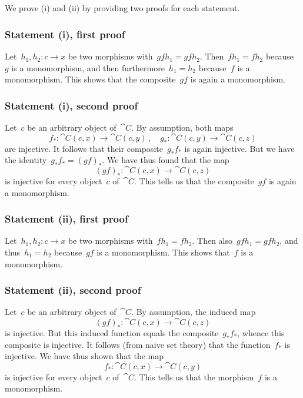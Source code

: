 \subsection{}

We prove (i) and (ii) by providing two proofs for each statement.



\subsubsection*{Statement (i), first proof}

Let~$h_1, h_2 \colon c \to x$ be two morphisms with~$gf h_1 = gf h_2$.
Then~$f h_1 = f h_2$ because~$g$ is a monomorphism, and then furthermore~$h_1 = h_2$ because~$f$ is a monomorphism.
This shows that the composite~$g f$ is again a monomorphism.



\subsubsection*{Statement (i), second proof}

Let~$c$ be an arbitrary object of~$\cat{C}$.
By assumption, both maps
\[
	f_* \colon \cat{C}(c, x) \to \cat{C}(c, y) \,,
	\quad
	g_* \colon \cat{C}(c, y) \to \cat{C}(c, z)
\]
are injective.
It follows that their composite~$g_* f_*$ is again injective.
But we have the identity~$g_* f_* = (g f)_*$.
We have thus found that the map
\[
	(g f)_* \colon \cat{C}(c, x) \to \cat{C}(c, z)
\]
is injective for every object~$c$ of~$\cat{C}$.
This tells us that the composite~$g f$ is again a monomorphism.



\subsubsection*{Statement (ii), first proof}

Let~$h_1, h_2 \colon c \to x$ be two morphisms with~$f h_1 = f h_2$.
Then also~$g f h_1 = g f h_2$, and thus~$h_1 = h_2$ because~$g f$ is a monomorphism.
This shows that~$f$ is a monomorphism.



\subsubsection*{Statement (ii), second proof}

Let~$c$ be an arbitrary object of~$\cat{C}$.
By assumption, the induced map
\[
	(g f)_* \colon \cat{C}(c, x) \to \cat{C}(c, z)
\]
is injective.
But this induced function equals the composite~$g_* f_*$, whence this composite is injective.
It follows (from naive set theory) that the function~$f_*$ is injective.
We have thus shown that the map
\[
	f_* \colon \cat{C}(c, x) \to \cat{C}(c, y)
\]
is injective for every object~$c$ of~$\cat{C}$.
This tells us that the morphism~$f$ is a monomorphism.




